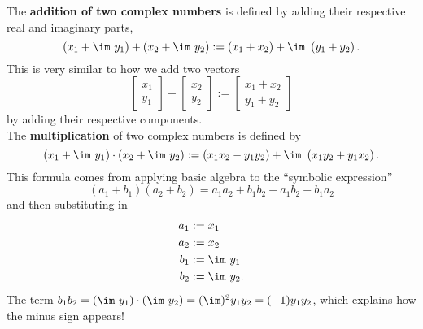 The \textbf{addition of two complex numbers} is defined by adding their respective real and imaginary parts, 
\begin{equation}
    \label{eq:AdditionComplexNumbers}
    \left(x_1 + \im~ y_1\right) + \left( x_2 + \im~ y_2 \right): = \left(x_1 + x_2 \right) + \im~ \left(y_1 + y_2  \right).
\end{equation}
This is very similar to how we add two vectors
$$\left[\begin{array}{c} x_1 \\ y_1 \end{array}  \right] + \left[\begin{array}{c} x_2 \\ y_2 \end{array}  \right] := \left[\begin{array}{c} x_1 + x_2\\ y_1 + y_2\end{array}  \right]$$
by adding their respective components. \\

The \textbf{multiplication} of two complex numbers is defined by
\begin{equation}
    \label{eq:MultiplicationComplexNumbers}
    \left(x_1 + \im~ y_1\right) \cdot \left( x_2 + \im~ y_2 \right): = \left(x_1 x_2 - y_1 y_2\right) + \im~ \left(x_1 y_2 + y_1 x_2 \right).
\end{equation}
This formula comes from applying basic algebra to the ``symbolic expression'' 
$$(a_1 + b_1) (a_2 + b_2) = a_1 a_2 + b_1 b_2 + a_1 b_2 + b_1 a_2 $$
and then substituting in
\begin{align*}
    a_1& := x_1\\
    a_2& := x_2\\
    b_1& := \im~y_1\\
    b_2& := \im ~y_2.
\end{align*}
The term $b_1 b_2 = (\im~y_1) \cdot (\im~y_2)= (\im)^2 y_1 y_2 = (-1) y_1 y_2$, which explains how the minus sign appears!\\

